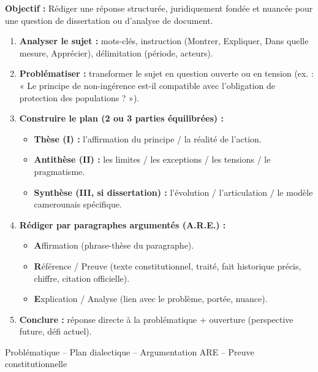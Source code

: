 \documentclass[11pt]{article}
\newcommand{\cle}[1]{{\popxbold\color{popdark}#1}}
\begin{document}
\begin{methode}
\textbf{Objectif :} Rédiger une réponse structurée, juridiquement fondée et nuancée pour une question de dissertation ou d'analyse de document.
\begin{enumerate}
    \item \textbf{Analyser le sujet :} mots-clés, instruction (Montrer, Expliquer, Dans quelle mesure, Apprécier), délimitation (période, acteurs).
    \item \textbf{Problématiser :} transformer le sujet en question ouverte ou en tension (ex. : « Le principe de non-ingérence est-il compatible avec l'obligation de protection des populations ? »).
    \item \textbf{Construire le plan (2 ou 3 parties équilibrées) :}
    \begin{itemize}
        \item \textbf{Thèse (I) :} l'affirmation du principe / la réalité de l'action.
        \item \textbf{Antithèse (II) :} les limites / les exceptions / les tensions / le pragmatisme.
        \item \textbf{Synthèse (III, si dissertation) :} l'évolution / l'articulation / le modèle camerounais spécifique.
    \end{itemize}
    \item \textbf{Rédiger par paragraphes argumentés (A.R.E.) :}
    \begin{itemize}
        \item \textbf{A}ffirmation (phrase-thèse du paragraphe).
        \item \textbf{R}éférence / Preuve (texte constitutionnel, traité, fait historique précis, chiffre, citation officielle).
        \item \textbf{E}xplication / Analyse (lien avec le problème, portée, nuance).
    \end{itemize}
    \item \textbf{Conclure :} réponse directe à la problématique + ouverture (perspective future, défi actuel).
\end{enumerate}
\cle{Problématique} -- \cle{Plan dialectique} -- \cle{Argumentation ARE} -- \cle{Preuve constitutionnelle}
\end{methode}
\end{document}
